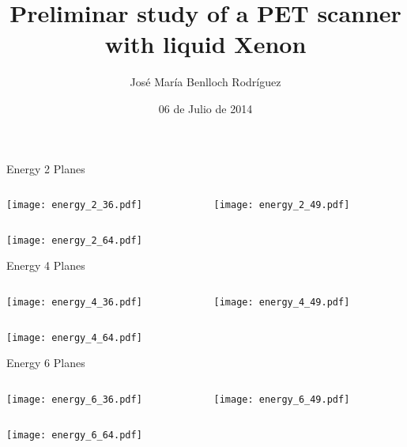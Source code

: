 \documentclass{beamer}
\title{Preliminar study of a PET scanner with liquid Xenon}
\author[José María Benlloch Rodríguez]{José María Benlloch Rodríguez}
\institute{NEXT Collaboration}
\date{06 de Julio de 2014}
\begin{document}
\begin{frame}
  \titlepage
\end{frame}

\begin{frame}{Energy 2 Planes}
	\begin{columns}[onlytextwidth]
		\begin{column}{0.5\textwidth}
			\texttt{[image: energy\_2\_36.pdf]}
		 \end{column}
		 \begin{column}{0.5\textwidth}
			\texttt{[image: energy\_2\_49.pdf]}
		 \end{column}
 \end{columns}
 		\begin{center} {\texttt{[image: energy\_2\_64.pdf]}} \end{center}
\end{frame}

\begin{frame}{Energy 4 Planes}
	\begin{columns}[onlytextwidth]
		\begin{column}{0.5\textwidth}
			\texttt{[image: energy\_4\_36.pdf]}
		 \end{column}
		 \begin{column}{0.5\textwidth}
			\texttt{[image: energy\_4\_49.pdf]}
		 \end{column}
 \end{columns}
 		\begin{center} {\texttt{[image: energy\_4\_64.pdf]}} \end{center}
\end{frame}

\begin{frame}{Energy 6 Planes}
	\begin{columns}[onlytextwidth]
		\begin{column}{0.5\textwidth}
			\texttt{[image: energy\_6\_36.pdf]}
		 \end{column}
		 \begin{column}{0.5\textwidth}
			\texttt{[image: energy\_6\_49.pdf]}
		 \end{column}
 \end{columns}
 		\begin{center} {\texttt{[image: energy\_6\_64.pdf]}} \end{center}
\end{frame}
\end{document}
